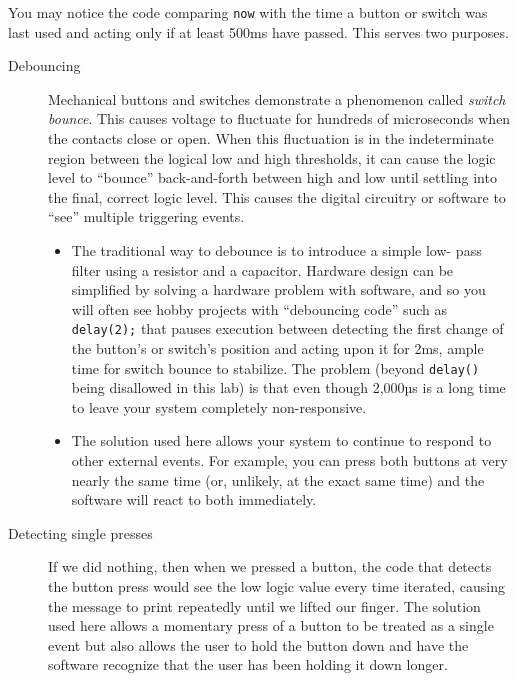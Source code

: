 You may notice the code comparing \lstinline{now} with the time a button or
switch was last used and acting only if at least 500ms have passed. This serves
two purposes.
\begin{description}
\item [Debouncing] Mechanical buttons and switches demonstrate a phenomenon
    called \textit{switch bounce}. This causes voltage to fluctuate for
    hundreds of microseconds when the contacts close or open. When this
    fluctuation is in the indeterminate region between the logical low and high
    thresholds, it can cause the logic level to ``bounce'' back-and-forth
    between high and low until settling into the final, correct logic level.
    This causes the digital circuitry or software to ``see'' multiple
    triggering events. \\
    \begin{itemize}
    \item The traditional way to debounce is to introduce a simple low-
    pass filter using a resistor and a capacitor. Hardware design can be
    simplified by solving a hardware problem with software, and so you will
    often see hobby projects with ``debouncing code'' such as
    \lstinline{delay(2);} that pauses execution between detecting the first
    change of the button's or switch's position and acting upon it for 2ms,
    ample time for switch bounce to stabilize. The problem (beyond
    \lstinline{delay()} being disallowed in this lab) is that even though
    2,000µs is a long time to leave your system completely non-responsive.
    \item The solution used here allows your system to continue to respond to
    other external events. For example, you can press both buttons at very
    nearly the same time (or, unlikely, at the exact same time) and the
    software will react to both immediately.
    \end{itemize}
\item [Detecting single presses] If we did nothing, then when we pressed a
    button, the code that detects the button press would see the low logic
    value every time  iterated, causing the message to print
    repeatedly until we lifted our finger. The solution used here allows a
    momentary press of a button to be treated as a single event but also allows
    the user to hold the button down and have the software recognize that the
    user has been holding it down longer.
\end{description}


